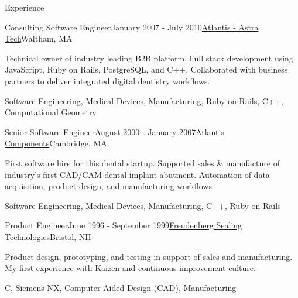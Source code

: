 \documentclass{resume}
\begin{document}
\begin{rSection}{Experience}

\begin{rSubsection}{Consulting Software Engineer}{January 2007 - July 2010}{\href{https://dentsplysirona.com}{Atlantis - Astra Tech}}{Waltham, MA}
\item Technical owner of industry leading B2B platform. Full stack development using JavaScript, Ruby on Rails, PostgreSQL, and C++. Collaborated with business partners to deliver integrated digital dentistry workflows.
\item Software Engineering, Medical Devices, Manufacturing, Ruby on Rails, C++, Computational Geometry
\end{rSubsection}

\begin{rSubsection}{Senior Software Engineer}{August 2000 - January 2007}{\href{https://dentsplysirona.com}{Atlantis Components}}{Cambridge, MA}
\item First software hire for this dental startup. Supported sales \& manufacture of industry's first CAD/CAM dental implant abutment. Automation of data acquisition, product design, and manufacturing workflows
\item Software Engineering, Medical Devices, Manufacturing, C++, Ruby on Rails
\end{rSubsection}

\begin{rSubsection}{Product Engineer}{June 1996 - September 1999}{\href{https://fst.com}{Freudenberg Sealing Technologies}}{Bristol, NH}
\item Product design, prototyping, and testing in support of sales and manufacturing. My first experience with Kaizen and continuous improvement culture.
\item C, Siemens NX, Computer-Aided Design (CAD), Manufacturing
\end{rSubsection}

\end{rSection}
\end{document}
